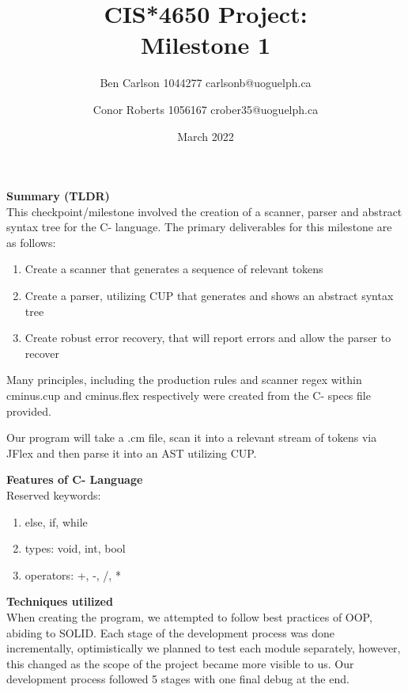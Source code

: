 \documentclass[12pt]{extarticle}
\title{CIS*4650 Project:\\ Milestone 1}
\author{
    Ben Carlson 1044277 carlsonb@uoguelph.ca \\
    \and 
    Conor Roberts 1056167  crober35@uoguelph.ca \\
}
\date{March 2022}
\begin{document}
\maketitle
\pagebreak
\textbf{Summary (TLDR)}\\

This checkpoint/milestone involved the creation of a scanner, parser and abstract syntax tree for the C- language.
The primary deliverables for this milestone are as follows:

\begin{enumerate}
    \item Create a scanner that generates a sequence of relevant tokens
    \item Create a parser, utilizing CUP that generates and shows an abstract syntax tree
    \item Create robust error recovery, that will report errors and allow the parser to recover
\end{enumerate}

Many principles, including the production rules and scanner regex within cminus.cup and cminus.flex respectively were created from the C- specs file provided.

Our program will take a .cm file, scan it into a relevant stream of tokens via JFlex and then parse it into an AST utilizing CUP.

\textbf{Features of C- Language}
\\ Reserved keywords:
\begin{enumerate}
    \item else, if, while
    \item types: void, int, bool
    \item operators: +, -, /, *
\end{enumerate}
\pagebreak
\textbf{Techniques utilized}
\\
When creating the program, we attempted to follow best practices of OOP, abiding to SOLID. Each stage of the development process was done incrementally, optimistically we planned to test each module separately, however, this changed as the scope of the project became more visible to us. Our development process followed 5 stages with one final debug at the end.
\end{document}
